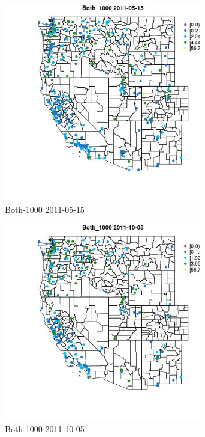 \begin{figure} 
\centering  
\includegraphics[width=0.77\textwidth]{Code_Outputs/ML_input_report_ML_input_PM25_Step5_part_d_de_duplicated_aves_ML_input_MapObsBoth_10002011-05-15.jpg} 
\caption{\label{fig:ML_input_report_ML_input_PM25_Step5_part_d_de_duplicated_aves_ML_inputMapObsBoth_10002011-05-15}Both-1000 2011-05-15} 
\end{figure} 
 

\begin{figure} 
\centering  
\includegraphics[width=0.77\textwidth]{Code_Outputs/ML_input_report_ML_input_PM25_Step5_part_d_de_duplicated_aves_ML_input_MapObsBoth_10002011-10-05.jpg} 
\caption{\label{fig:ML_input_report_ML_input_PM25_Step5_part_d_de_duplicated_aves_ML_inputMapObsBoth_10002011-10-05}Both-1000 2011-10-05} 
\end{figure} 
 


